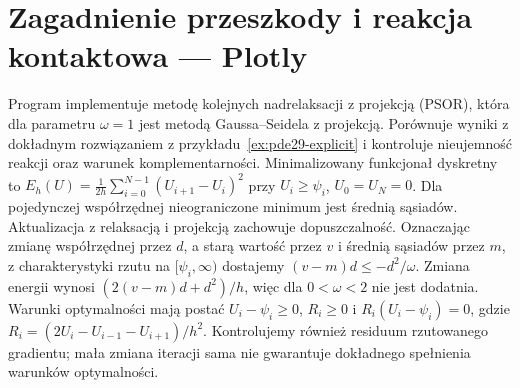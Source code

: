 \section{Zagadnienie przeszkody i reakcja kontaktowa — Plotly}
\label{sec:pde29-code}
Program implementuje metodę kolejnych nadrelaksacji
z projekcją (PSOR), która dla parametru $\omega=1$
jest metodą Gaussa--Seidela z projekcją.
Porównuje wyniki z dokładnym rozwiązaniem
z przykładu~\ref{ex:pde29-explicit}
i kontroluje nieujemność reakcji oraz warunek komplementarności.
Minimalizowany funkcjonał dyskretny to
$E_h(U)=\frac1{2h}\sum_{i=0}^{N-1}(U_{i+1}-U_i)^2$
przy $U_i\ge\psi_i$, $U_0=U_N=0$.
Dla pojedynczej współrzędnej nieograniczone minimum
jest średnią sąsiadów. Aktualizacja z relaksacją
i projekcją zachowuje dopuszczalność.
Oznaczając zmianę współrzędnej przez $d$,
a starą wartość przez $v$ i średnią sąsiadów przez $m$,
z charakterystyki rzutu na $[\psi_i,\infty)$ dostajemy
$(v-m)d\le-d^2/\omega$.
Zmiana energii wynosi $(2(v-m)d+d^2)/h$,
więc dla $0<\omega<2$ nie jest dodatnia.
Warunki optymalności mają postać
$U_i-\psi_i\ge0$, $R_i\ge0$ i
$R_i(U_i-\psi_i)=0$, gdzie
$R_i=(2U_i-U_{i-1}-U_{i+1})/h^2$.
Kontrolujemy również residuum rzutowanego gradientu;
mała zmiana iteracji sama nie gwarantuje
dokładnego spełnienia warunków optymalności.
